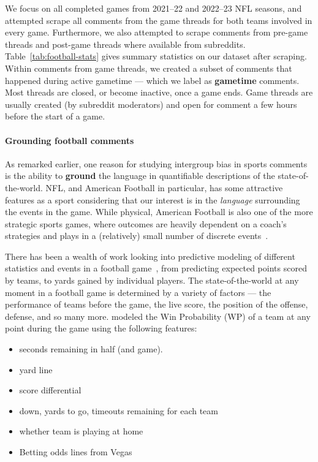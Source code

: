 We focus on all completed games from 2021--22 and 2022--23 NFL seasons, and attempted scrape all comments from the game threads for both teams involved in every game. Furthermore, we also attempted to scrape comments from pre-game threads and post-game threads where available from subreddits. Table~\ref{tab:football-stats} gives summary statistics on our dataset after scraping. Within comments from game threads, we created a subset of comments that happened during active gametime --- which we label as \textbf{gametime} comments. Most threads are closed, or become inactive, once a game ends. Game threads are usually created (by subreddit moderators) and open for comment a few hours before the start of a game.



\paragraph{Grounding football comments} As remarked earlier, one reason for studying intergroup bias in sports comments is the ability to \textbf{ground} the language in quantifiable descriptions of the state-of-the-world. NFL, and American Football in particular, has some attractive features as a sport considering that our interest is in the \emph{language} surrounding the events in the game. While physical, American Football is also one of the more strategic sports games, where outcomes are heavily dependent on a coach's strategies and plays in a (relatively) small number of discrete events~\citep{pelechrinis2016anatomy}.

There has been a wealth of work looking into predictive modeling of different statistics and events in a football game~\citep{horowitz2017nflscrapr, Yurko2018nflWARAR}, from predicting expected points scored by teams, to yards gained by individual players. The state-of-the-world at any moment in a football game is determined by a variety of factors --- the performance of teams before the game, the live score, the position of the offense, defense, and so many more. \citet{baldwin2021nflfastr} modeled the {Win Probability} (WP) of a team at any point during the game using the following features:

\begin{itemize}
    \item seconds remaining in half (and game).
    \item yard line
    \item score differential
    \item down, yards to go, timeouts remaining for each team
    \item whether team is playing at home
    \item Betting odds lines from Vegas
\end{itemize}

